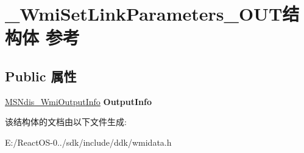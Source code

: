\hypertarget{struct___wmi_set_link_parameters___o_u_t}{}\section{\+\_\+\+Wmi\+Set\+Link\+Parameters\+\_\+\+O\+U\+T结构体 参考}
\label{struct___wmi_set_link_parameters___o_u_t}
\subsection*{Public 属性}
\begin{DoxyCompactItemize}
\item 
\mbox{\label{struct___wmi_set_link_parameters___o_u_t_a09c65ca2611be2f223b6e8c5b7a34acc}} 
\hyperlink{struct___m_s_ndis___wmi_output_info}{M\+S\+Ndis\+\_\+\+Wmi\+Output\+Info} {\bfseries Output\+Info}
\end{DoxyCompactItemize}


该结构体的文档由以下文件生成\+:\begin{DoxyCompactItemize}
\item 
E\+:/\+React\+O\+S-\/0../sdk/include/ddk/wmidata.\+h\end{DoxyCompactItemize}
